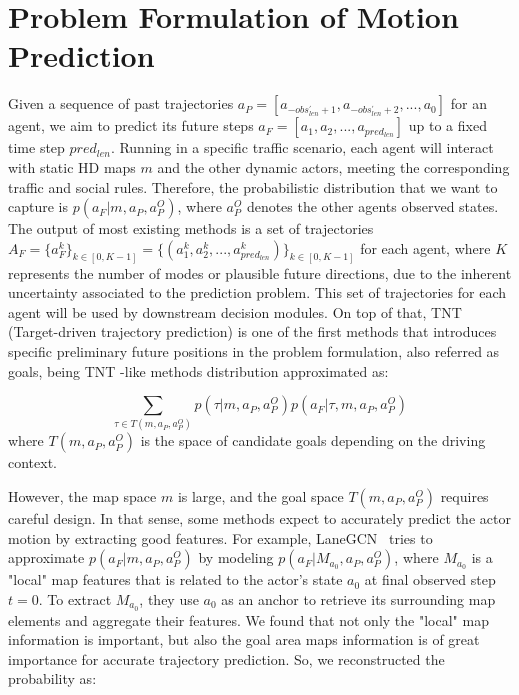 \section{Problem Formulation of Motion Prediction}
\label{sec:2_problem_formulation_mp}

Given a sequence of past trajectories $a_{P}=[a_{-obs_{len}^{'}+1},a_{-obs_{len}^{'}+2},...,a_{0}]$ for an agent, we aim to predict its future steps $a_{F}=[a_{1},a_{2},...,a_{pred_{len}}]$ up to a fixed time step $pred_{len}$. Running in a specific traffic scenario, each agent will interact with static HD maps $m$ and the other dynamic actors, meeting the corresponding traffic and social rules. Therefore, the probabilistic distribution that we want to capture is $p(a_F|m, a_P, a^O_P)$, where $a^O_P$ denotes the other agents observed states. The output of most existing methods is a set of trajectories $A_F = \{a_{F}^k\}_{k \in [0,K-1]}= \{(a_{1}^k,a_{2}^k,...,a_{pred_{len}}^k)\}_{k \in [0,K-1]}$ for each agent, where $K$ represents the number of modes or plausible future directions, due to the inherent uncertainty associated to the prediction problem. This set of trajectories for each agent will be used by downstream decision modules. On top of that, TNT (Target-driven trajectory prediction) \cite{zhao2021tnt} is one of the first methods that introduces specific preliminary future positions in the problem formulation, also referred as goals, being TNT \cite{zhao2021tnt}-like methods distribution approximated as:

\begin{equation}
	\sum_{\tau \in T(m, a_P, a^O_P)}{p(\tau|m, a_P, a^O_P)p(a_F|\tau, m, a_P, a^O_P)}
\end{equation}
where $T(m, a_P, a^O_P)$ is the space of candidate goals depending on the driving context.

However, the map space $m$ is large, and the goal space $T(m, a_P, a^O_P)$ requires careful design. In that sense, some methods expect to accurately predict the actor motion by extracting good features. For example, LaneGCN~\cite{liang2020learning} tries to approximate $p(a_F|m, a_P, a^O_P)$ by modeling $p(a_F|M_{a_0}, a_P, a^O_P)$, 
where $M_{a_0}$ is a "local" map features that is related to the actor's state $a_0$ at final observed step $t=0$.
To extract $M_{a_0}$, they use $a_0$ as an anchor to retrieve its surrounding map elements and aggregate their features. We found that not only the "local" map information is important, but also the goal area maps information is of great importance for accurate trajectory prediction. 
So, we reconstructed the probability as:

